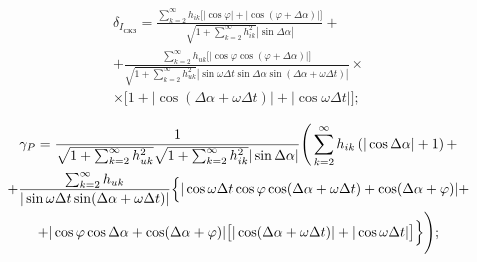 \begin{multline}

\delta _{I_{\text{СКЗ}}}

=\frac{\sum_{k=2}^\infty h_{ik} \bigl[| \cos \varphi |+|

\cos ( \varphi +\Delta \alpha ) |\bigr]}{\sqrt

{1+\sum_{k=2}^\infty h_{ik}^2} | \sin \Delta \alpha |}+

\\

+\frac{\sum_{k=2}^\infty h_{uk} \bigl[ | \cos \varphi

\cos ( \varphi +\Delta \alpha )| \bigr]}{\sqrt

{1+\sum_{k=2}^\infty h_{uk}^2 } \left| \sin \omega \Delta

t\sin \Delta \alpha \sin (\Delta \alpha +\omega \Delta

t)\right|}\times

\\

\label{mel:eq13} \times \bigl[ 1+| \cos ( \Delta \alpha +\omega

\Delta t) |+\left| \cos \omega \Delta t \right| \bigr]; 

\end{multline}



\vspace{-5mm}



\begin{multline}

\label{mel:eq13}

 \gamma _P =\frac{1}{\sqrt {1+\sum_{k=2}^\infty

h_{uk}^2 } \sqrt {1+\sum_{k=2}^\infty h_{ik}^2 }

|\sin \Delta \alpha|} \Bigg( \sum\limits_{k=2}^\infty

h_{ik} \left( |\cos \Delta \alpha|+1 \right)

+\\

+\frac{\sum_{k=2}^\infty h_{uk} }{|\sin

\omega \Delta t\sin (\Delta \alpha +\omega \Delta t)|}

\Bigl\{ |\cos \omega \Delta t\cos \varphi

\cos (\Delta \alpha +\omega \Delta t)+ \cos (\Delta \alpha +\varphi)|+ \\ +  |\cos

\varphi \cos \Delta \alpha +\cos (\Delta \alpha +\varphi)|

\bigl[ |\cos(\Delta \alpha +\omega \Delta t)|+

|\cos \omega \Delta t| \bigr]\Bigr\}  \Bigg );

\end{multline}



